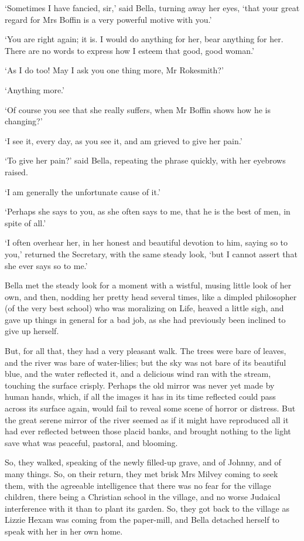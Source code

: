 ‘Sometimes I have fancied, sir,’ said Bella, turning away her eyes,
‘that your great regard for Mrs Boffin is a very powerful motive with
you.’

‘You are right again; it is. I would do anything for her, bear anything
for her. There are no words to express how I esteem that good, good
woman.’

‘As I do too! May I ask you one thing more, Mr Rokesmith?’

‘Anything more.’

‘Of course you see that she really suffers, when Mr Boffin shows how he
is changing?’

‘I see it, every day, as you see it, and am grieved to give her pain.’

‘To give her pain?’ said Bella, repeating the phrase quickly, with her
eyebrows raised.

‘I am generally the unfortunate cause of it.’

‘Perhaps she says to you, as she often says to me, that he is the best
of men, in spite of all.’

‘I often overhear her, in her honest and beautiful devotion to him,
saying so to you,’ returned the Secretary, with the same steady look,
‘but I cannot assert that she ever says so to me.’

Bella met the steady look for a moment with a wistful, musing little
look of her own, and then, nodding her pretty head several times, like
a dimpled philosopher (of the very best school) who was moralizing on
Life, heaved a little sigh, and gave up things in general for a bad job,
as she had previously been inclined to give up herself.

But, for all that, they had a very pleasant walk. The trees were bare of
leaves, and the river was bare of water-lilies; but the sky was not bare
of its beautiful blue, and the water reflected it, and a delicious
wind ran with the stream, touching the surface crisply. Perhaps the old
mirror was never yet made by human hands, which, if all the images it
has in its time reflected could pass across its surface again, would
fail to reveal some scene of horror or distress. But the great serene
mirror of the river seemed as if it might have reproduced all it had
ever reflected between those placid banks, and brought nothing to the
light save what was peaceful, pastoral, and blooming.

So, they walked, speaking of the newly filled-up grave, and of Johnny,
and of many things. So, on their return, they met brisk Mrs Milvey
coming to seek them, with the agreeable intelligence that there was no
fear for the village children, there being a Christian school in the
village, and no worse Judaical interference with it than to plant its
garden. So, they got back to the village as Lizzie Hexam was coming from
the paper-mill, and Bella detached herself to speak with her in her own
home.

